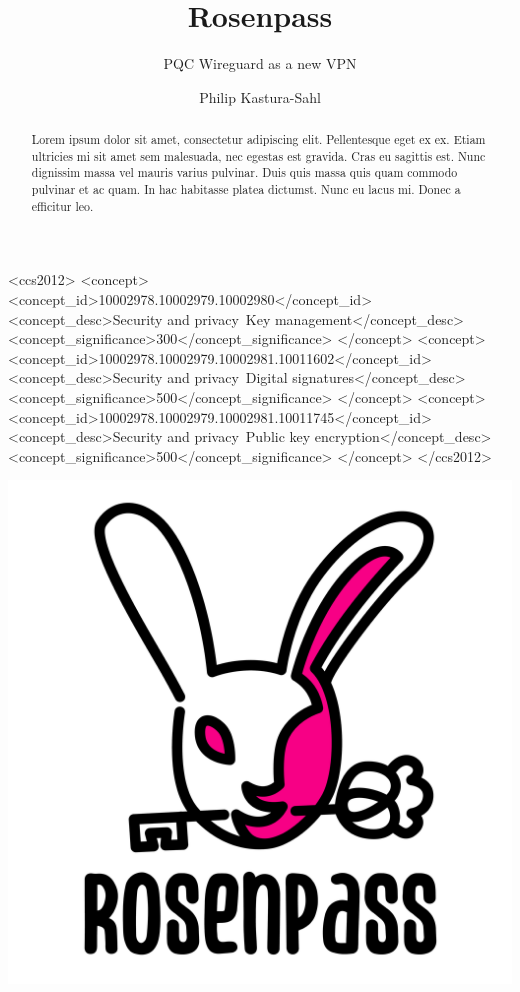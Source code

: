 \documentclass[sigconf]{acmart}
\begin{document}
\title{Rosenpass}
\subtitle{PQC Wireguard as a new VPN}

\author{Philip Kastura-Sahl}

\renewcommand{\shortauthors}{Philip Kastura-Sahl}

\begin{abstract}
Lorem ipsum dolor sit amet, consectetur adipiscing elit. Pellentesque eget ex ex. Etiam ultricies mi sit amet sem malesuada, nec egestas est gravida. Cras eu sagittis est. Nunc dignissim massa vel mauris varius pulvinar. Duis quis massa quis quam commodo pulvinar et ac quam. In hac habitasse platea dictumst. Nunc eu lacus mi. Donec a efficitur leo.
\end{abstract}


\begin{CCSXML}
<ccs2012>
   <concept>
       <concept_id>10002978.10002979.10002980</concept_id>
       <concept_desc>Security and privacy~Key management</concept_desc>
       <concept_significance>300</concept_significance>
       </concept>
   <concept>
       <concept_id>10002978.10002979.10002981.10011602</concept_id>
       <concept_desc>Security and privacy~Digital signatures</concept_desc>
       <concept_significance>500</concept_significance>
       </concept>
   <concept>
       <concept_id>10002978.10002979.10002981.10011745</concept_id>
       <concept_desc>Security and privacy~Public key encryption</concept_desc>
       <concept_significance>500</concept_significance>
       </concept>
 </ccs2012>
\end{CCSXML}



\begin{teaserfigure}
      \includegraphics[width=.2\textwidth]{graphics/RosenPass-Logo.pdf}
\end{teaserfigure}
\end{document}
